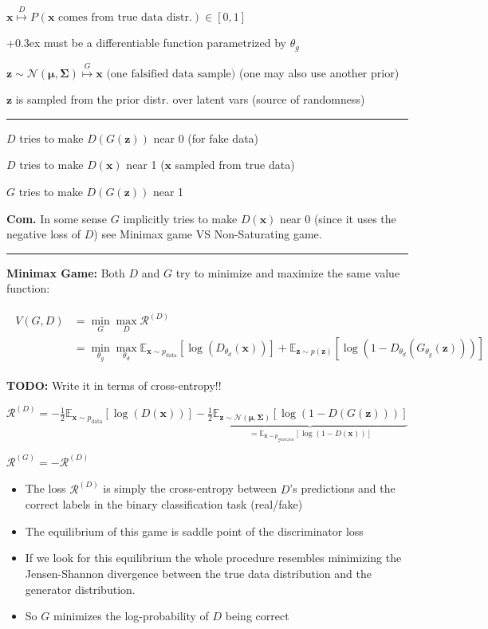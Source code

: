 \documentclass[a2paper,8pt]{extarticle}
\newcommand{\cN}{\mathcal{N}}
\newcommand{\cR}{\mathcal{R}}
\newcommand{\Prob}[2][]{P_{#1}\left( #2 \right)}
\newcommand{\Exp}[2][]{{\mathbb{E}_{#1}}\left[ #2
\right]}
\newcommand{\mat}[1]{\mathbf{#1}}
\renewcommand{\vec}[1]{\mathbf{#1}}
\newcommand{\vx}{\vec{x}}
\newcommand{\vz}{\vec{z}}
\newcommand{\vmu}{\boldsymbol{\mu}}
\newcommand{\MSigma}{\mat{\Sigma}}
\newcommand{\todo}[1]{\textbf{TODO:} #1}
\newcommand{\todo}[1]{%
}
\newcommand{\customboxpaddingsize}{0pt}
\newcommand{\emptyarg}[1][]{\ifthenelse{\isempty{#1}}{}{\ (#1)}}
\newcommand{\Def}[1][]{{\setlength\fboxsep{\customboxpaddingsize}
\colorbox{defcolor}{%
\color{custtitlecolor}{\textbf{D.\emptyarg[#1]}}}\kern+0.3ex}}
\newcommand{\Com}{\textbf{Com.} }
\newcommand{\sep}{\vspace{0pt}\noindent\hrule\vspace{0pt}}
\newcommand{\ssep}{\hdashrule[1.1ex]{\linewidth}{0.1pt}{0.3mm}\vspace{-6pt}}
\newcommand{\sep}{\vspace{5pt}\noindent\hrule\vspace{5pt}}
\newcommand{\ssep}{\hdashrule[1.1ex]{\linewidth}{0.1pt}{0.3mm}\vspace{-3pt}}
\begin{document}
\begin{landscape}
\begin{multicols*}{7}
$
\vx\stackrel{D}{\mapsto}\Prob{\vx \text{ comes  from true data distr.}}\in[0,1]
$

\ssep

\Def[Generator $G$] must be a differentiable function parametrized by $\theta_g$

$
\vz\sim\cN(\vmu,\MSigma)
\stackrel{G}{\mapsto}
\vx
\text{ (one falsified data sample)}
$ (one may also use another prior)

$\vz$ is sampled from the prior distr. over latent vars (source of randomness)

\sep

$D$ tries to make $D(G(\vz))$ near 0 (for fake data)

$D$ tries to make $D(\vx)$ near 1 ($\vx$ sampled from true data)

$G$ tries to make $D(G(\vz))$ near 1

\Com In some sense $G$ implicitly tries to make $D(\vx)$ near 0 (since it uses
the negative loss of $D$) see Minimax game VS Non-Saturating game.

\sep

\textbf{Minimax Game:} Both $D$ and $G$ try to minimize and maximize the same
value function:

\begin{gather*}
\begin{align*}
V(G,D)
&=\min_{G}\max_{D} \cR^{(D)}
\\
&=\min_{\theta_g}\max_{\theta_d}
\Exp[\vx\sim p_{\text{data}}]{\log(D_{\theta_d}(\vx))}
+
\Exp[\vz\sim p(\vz)]{\log(1-D_{\theta_d}(G_{\theta_g}(\vz)))}
\end{align*}
\end{gather*}

\todo{Write it in terms of cross-entropy!!}

$
\cR^{(D)}
=
-\frac{1}{2}
\Exp[\vx\sim p_{\text{data}}]{\log(D(\vx))}
-\frac{1}{2}
\underbrace{\Exp[\vz\sim \cN(\vmu,\MSigma)]{\log(1-D(G(\vz)))}}_{=
\Exp[\vx\sim p_{\text{generator}}]{\log(1-D(\vx))}}
$

$
\cR^{(G)}
=
-\cR^{(D)}
$ 

\begin{itemize}
  \item The loss $\cR^{(D)}$ is simply the cross-entropy between $D$'s
  predictions and the correct labels in the binary classification task (real/fake)
  \item The equilibrium of this game is saddle point of the discriminator loss
  \item If we look for this equilibrium the whole procedure resembles
  minimizing the Jensen-Shannon divergence between the true data distribution
  and the generator distribution.
  \item So $G$ minimizes the log-probability of $D$ being correct
\end{itemize}


\end{multicols*}
\end{landscape}
\end{document}
